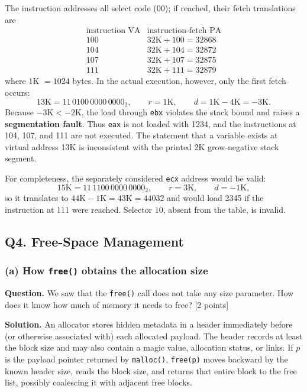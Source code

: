The instruction addresses all select code (\(00\)); if reached, their fetch
translations are
\[
\begin{array}{c|c}
\text{instruction VA} & \text{instruction-fetch PA}\\ \hline
100 & 32\text{K}+100=32868\\
104 & 32\text{K}+104=32872\\
107 & 32\text{K}+107=32875\\
111 & 32\text{K}+111=32879
\end{array}
\]
where \(1\)K \(=1024\) bytes.  In the actual execution, however, only the
first fetch occurs:
\[
13\text{K}=11\,0100\,0000\,0000_2,\qquad
r=1\text{K},\qquad d=1\text{K}-4\text{K}=-3\text{K}.
\]
Because \(-3\text{K}<-2\text{K}\), the load through \texttt{ebx} violates the
stack bound and raises a \textbf{segmentation fault}.  Thus \texttt{eax} is not
loaded with 1234, and the instructions at 104, 107, and 111 are not executed.
The statement that a variable exists at virtual address 13K is inconsistent
with the printed 2K grow-negative stack segment.

For completeness, the separately considered \texttt{ecx} address would be
valid:
\[
15\text{K}=11\,1100\,0000\,0000_2,\qquad
r=3\text{K},\qquad d=-1\text{K},
\]
so it translates to \(44\text{K}-1\text{K}=43\text{K}=44032\) and would load
2345 if the instruction at 111 were reached.  Selector \(10\), absent from the
table, is invalid.

\subsection*{Q4. Free-Space Management}

\subsubsection*{(a) How \texttt{free()} obtains the allocation size}
\textbf{Question.} We saw that the \texttt{free()} call does not take any size
parameter. How does it know how much of memory it needs to free?
\hfill [2 points]

\textbf{Solution.}
An allocator stores hidden metadata in a header immediately before (or
otherwise associated with) each allocated payload.  The header records at
least the block size and may also contain a magic value, allocation status,
or links.  If \(p\) is the payload pointer returned by \texttt{malloc()},
\texttt{free(p)} moves backward by the known header size, reads the block
size, and returns that entire block to the free list, possibly coalescing it
with adjacent free blocks.

